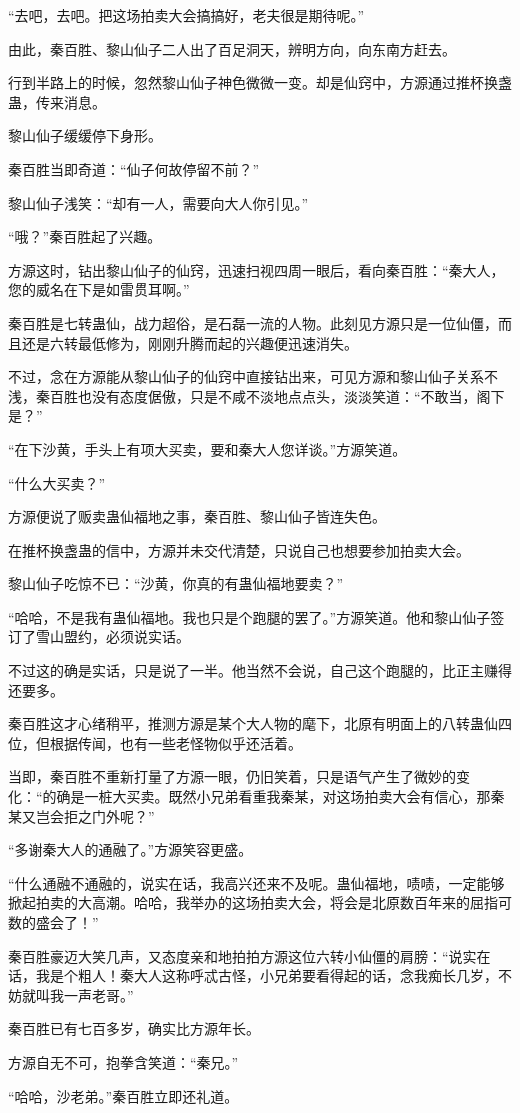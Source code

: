 \begin{this_body}
“去吧，去吧。把这场拍卖大会搞搞好，老夫很是期待呢。”

由此，秦百胜、黎山仙子二人出了百足洞天，辨明方向，向东南方赶去。

行到半路上的时候，忽然黎山仙子神色微微一变。却是仙窍中，方源通过推杯换盏蛊，传来消息。

黎山仙子缓缓停下身形。

秦百胜当即奇道：“仙子何故停留不前？”

黎山仙子浅笑：“却有一人，需要向大人你引见。”

“哦？”秦百胜起了兴趣。

方源这时，钻出黎山仙子的仙窍，迅速扫视四周一眼后，看向秦百胜：“秦大人，您的威名在下是如雷贯耳啊。”

秦百胜是七转蛊仙，战力超俗，是石磊一流的人物。此刻见方源只是一位仙僵，而且还是六转最低修为，刚刚升腾而起的兴趣便迅速消失。

不过，念在方源能从黎山仙子的仙窍中直接钻出来，可见方源和黎山仙子关系不浅，秦百胜也没有态度倨傲，只是不咸不淡地点点头，淡淡笑道：“不敢当，阁下是？”

“在下沙黄，手头上有项大买卖，要和秦大人您详谈。”方源笑道。

“什么大买卖？”

方源便说了贩卖蛊仙福地之事，秦百胜、黎山仙子皆连失色。

在推杯换盏蛊的信中，方源并未交代清楚，只说自己也想要参加拍卖大会。

黎山仙子吃惊不已：“沙黄，你真的有蛊仙福地要卖？”

“哈哈，不是我有蛊仙福地。我也只是个跑腿的罢了。”方源笑道。他和黎山仙子签订了雪山盟约，必须说实话。

不过这的确是实话，只是说了一半。他当然不会说，自己这个跑腿的，比正主赚得还要多。

秦百胜这才心绪稍平，推测方源是某个大人物的麾下，北原有明面上的八转蛊仙四位，但根据传闻，也有一些老怪物似乎还活着。

当即，秦百胜不重新打量了方源一眼，仍旧笑着，只是语气产生了微妙的变化：“的确是一桩大买卖。既然小兄弟看重我秦某，对这场拍卖大会有信心，那秦某又岂会拒之门外呢？”

“多谢秦大人的通融了。”方源笑容更盛。

“什么通融不通融的，说实在话，我高兴还来不及呢。蛊仙福地，啧啧，一定能够掀起拍卖的大高潮。哈哈，我举办的这场拍卖大会，将会是北原数百年来的屈指可数的盛会了！”

秦百胜豪迈大笑几声，又态度亲和地拍拍方源这位六转小仙僵的肩膀：“说实在话，我是个粗人！秦大人这称呼忒古怪，小兄弟要看得起的话，念我痴长几岁，不妨就叫我一声老哥。”

秦百胜已有七百多岁，确实比方源年长。

方源自无不可，抱拳含笑道：“秦兄。”

“哈哈，沙老弟。”秦百胜立即还礼道。

\end{this_body}

